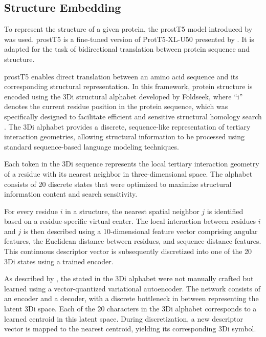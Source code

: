 \subsection{Structure Embedding}\label{sec:methods/feature_engineering/structure_embedding}

To represent the structure of a given protein, the \gls{prostT5} model introduced by \citet{Heinzinger2023} was used. \gls{prostT5} is a fine-tuned version of ProtT5-XL-U50 presented by \citep{Elnaggar2021}. It is adapted for the task of bidirectional translation between protein sequence and structure. 

\gls{prostT5} enables direct translation between an amino acid sequence and its corresponding structural representation. In this framework, protein structure is encoded using the 3Di structural alphabet developed by Foldseek, where “i” denotes the current residue position in the protein sequence, which was specifically designed to facilitate efficient and sensitive structural homology search \citep{Kempen2024}. The 3Di alphabet provides a discrete, sequence-like representation of tertiary interaction geometries, allowing structural information to be processed using standard sequence-based language modeling techniques.

Each token in the 3Di sequence represents the local tertiary interaction geometry of a residue with its nearest neighbor in three-dimensional space. The alphabet consists of 20 discrete states that were optimized to maximize structural information content and search sensitivity.

For every residue $i$ in a structure, the nearest spatial neighbor $j$ is identified based on a residue-specific virtual center. The local interaction between residues $i$ and $j$ is then described using a 10-dimensional feature vector comprising angular features, the Euclidean distance between residues, and sequence-distance features. This continuous descriptor vector is subsequently discretized into one of the 20 3Di states using a trained encoder.

As described by \citet{Kempen2024}, the stated in the 3Di alphabet were not manually crafted but learned using a vector-quantized variational autoencoder. The network consists of an encoder and a decoder, with a discrete bottleneck in between representing the latent 3Di space. Each of the 20 characters in the 3Di alphabet corresponds to a learned centroid in this latent space. During discretization, a new descriptor vector is mapped to the nearest centroid, yielding its corresponding 3Di symbol.

